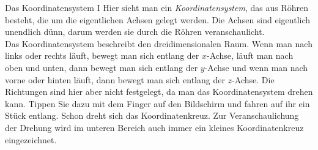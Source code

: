 \begin{surferPage}[Koordinaten I]{Das Koordinatensystem I}
Hier sieht man ein {\it Koordinatensystem}, das aus Röhren besteht, die um die eigentlichen Achsen gelegt werden. Die Achsen sind eigentlich unendlich dünn, darum werden sie durch die Röhren veranschaulicht. \\
Das Koordinatensystem beschreibt den dreidimensionalen Raum. Wenn man nach links oder rechts läuft, bewegt man sich entlang der $x$-Achse, läuft man nach oben und unten, dann bewegt man sich entlang der $y$-Achse und wenn man nach vorne oder hinten läuft, dann bewegt man sich entlang der $z$-Achse. Die Richtungen sind hier aber nicht festgelegt, da man das Koordinatensystem drehen kann. \newline \newline
Tippen Sie dazu mit dem Finger auf den Bildschirm und fahren auf ihr ein Stück entlang. Schon dreht sich das Koordinatenkreuz. Zur Veranschaulichung der Drehung wird im unteren Bereich auch immer ein kleines Koordinatenkreuz eingezeichnet.
\end{surferPage}
